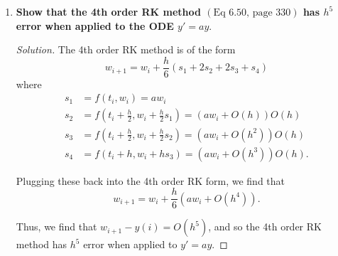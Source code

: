 \documentclass[11pt]{article}
\newenvironment{solution}
  {\renewcommand\qedsymbol{$\blacksquare$}\begin{proof}[Solution]}
  {\end{proof}}
\theoremstyle{definition}
\begin{document}
\begin{enumerate}
    \newpage

    \item \textbf{Show that the 4th order RK method $(\text{Eq } 6.50, \, \text{page } 330)$ has $h^5$ error when applied to the ODE $y'=ay.$} 
    
    \begin{solution}
    The 4th order RK method is of the form
    \[ w_{i+1} = w_i + \frac{h}{6}(s_1 + 2s_2 + 2s_3 + s_4) \]
    where \begin{align*}
    s_1 &= f(t_i, w_i) = aw_i \\
    s_2 &= f\left(t_i+\frac{h}{2}, w_i + \frac{h}{2}s_1\right) = (aw_i + O(h))O(h)\\
    s_3 &= f\left(t_i+\frac{h}{2}, w_i + \frac{h}{2}s_2\right) = (aw_i + O(h^2))O(h)\\
    s_4 &= f\left(t_i+ h, w_i + hs_3\right) = (aw_i + O(h^3))O(h).
    \end{align*}

    Plugging these back into the 4th order RK form, we find that
    \[w_{i+1} = w_i + \frac{h}{6}(aw_i + O(h^4)).\]

    Thus, we find that $w_{i+1} - y(i) = O(h^5)$, and so the 4th order RK method has $h^5$ error when applied to $y' = ay$.
    \end{solution}
\end{enumerate}
\end{document}
